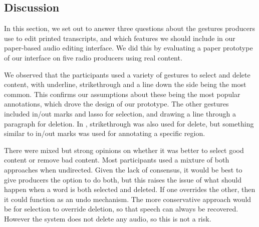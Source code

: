 

\subsection{Discussion}

In this section, we set out to answer three questions about the gestures producers use to edit printed transcripts, and
which features we should include in our paper-based audio editing interface. We did this by evaluating a paper
prototype of our interface on five radio producers using real content.


We observed that the participants used a variety of gestures to select and delete content, with underline,
strikethrough and a line down the side being the most common.  This confirms our assumptions about these being the most
popular annotations, which drove the design of our prototype.  The other gestures included in/out marks and lasso for
selection, and drawing a line through a paragraph for deletion.  In \citet{Weibel2008}, strikethrough was also used for
delete, but something similar to in/out marks was used for annotating a specific region.

There were mixed but strong opinions on whether it was better to select good content or remove bad content.  Most
participants used a mixture of both approaches when undirected. Given the lack of consensus, it would be best to give
producers the option to do both, but this raises the issue of what should happen when a word is both selected and
deleted.  If one overrides the other, then it could function as an undo mechanism. The more conservative approach would
be for selection to override deletion, so that speech can always be recovered. However the system does not delete any
audio, so this is not a risk.

